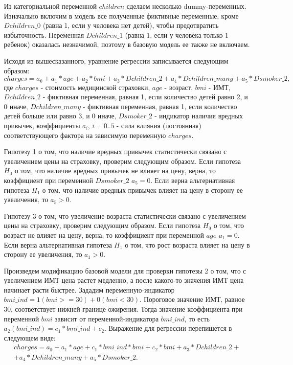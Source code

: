 \documentclass[a4paper,12pt]{article}
\begin{document}
Из категориальной переменной $children$ сделаем несколько dummy-переменных. Изначально включим в модель все полученные фиктивные переменные, кроме $Dchildren\_0$ (равна 1, если у человека нет детей), чтобы предотвратить избыточность. Переменная $Dchildren\_1$ (равна 1, если у человека только 1 ребенок) оказалась незначимой, поэтому в базовую модель ее также не включаем. 

Исходя из вышесказанного, уравнение регрессии записывается следующим образом:
\[charges = a_0 + a_1 * age + a_2 * bmi + a_3 * Dchildren\_2 + a_4 * Dchildren\_many + a_5 * Dsmoker\_2,\]	
где $charges$ - стоимость медицинской страховки,
$age$ - возраст,
$bmi$ - ИМТ,
$Dchildren\_2$ - фиктивная переменная, равная 1, если количество детей равно 2, и 0 иначе,
$Dchildren\_many$ - фиктивная переменная, равная 1, если количество детей больше или равно 3, и 0 иначе,
$Dsmoker\_2$ - индикатор наличия вредных привычек, коэффициенты $a_i$, $i=0..5$ - сила влияния (постоянная) соответствующего фактора на зависимую переменную $charges$.

Гипотезу 1 о том, что наличие вредных привычек статистически связано с увеличением цены на страховку, проверим следующим образом. Если гипотеза $H_0$ о том, что наличие вредных привычек не влияет на цену, верна, то коэффициент при переменной $Dsmoker\_2$ $a_5 = 0$. Если верна альтернативная гипотеза $H_1$ о том, что наличие вредных привычек влияет на цену в сторону ее увеличения, то $a_5 > 0$.

Гипотезу 3 о том, что увеличение возраста статистически связано с увеличением цены на страховку, проверим следующим образом. Если гипотеза $H_0$ о том, что возраст не влияет на цену, верна, то коэффициент при переменной $age$ $a_1 = 0$. Если верна альтернативная гипотеза $H_1$ о том, что рост возраста влияет на цену в сторону ее увеличения, то $a_1 > 0$.

Произведем модификацию базовой модели для проверки гипотезы 2 о том, что с увеличением ИМТ цена растет медленно, а после какого-то значения ИМТ цена начинает расти быстрее. Зададим переменную-индикатор $bmi\_ind = 1 (bmi >= 30) + 0 (bmi < 30)$. Пороговое значение ИМТ, равное 30, соответствует нижней границе ожирения. Тогда значение коэффициента при переменной $bmi$ зависит от переменной-индикатора $bmi\_ind$, то есть $a_2(bmi\_ind) = c_1 * bmi\_ind + c_2$. Выражение для регрессии перепишется в следующем виде:
\begin{align*}
	charges = a_0 + a_1 * age + c_1 * bmi\_ind * bmi + c_2 * bmi + a_3 * Dchildren\_2 + \\ + a_4 * Dchildren\_many + a_5 * Dsmoker\_2.
\end{align*}
\end{document}
